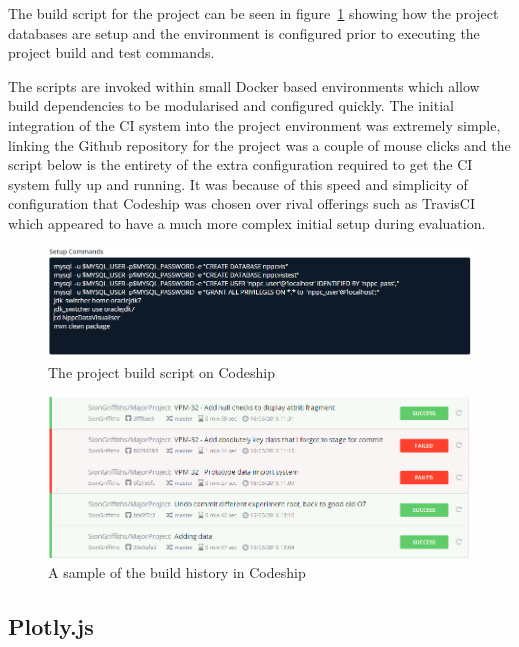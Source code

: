  The build script for the project can be seen in figure~\ref{fig:build_script} showing how the project databases are setup and the environment is configured prior to executing the project build and test commands.

 The scripts are invoked within small Docker \cite{docker} based environments which allow build dependencies to be modularised and configured quickly. The initial integration of the CI system into the project environment was extremely simple, linking the Github repository for the project was a couple of mouse clicks and the script below is the entirety of the extra configuration required to get the CI system fully up and running. It was because of this speed and simplicity of configuration that Codeship was chosen over rival offerings such as TravisCI \cite{travis} which appeared to have a much more complex initial setup during evaluation.

\begin{figure}[H]
    \centering
    \includegraphics[width=\textwidth]{images/tools/codeShipScript}
    \caption{The project build script on Codeship}
    \label{fig:build_script}
\end{figure} 

\begin{figure}[H]
    \centering
    \includegraphics[width=\textwidth]{images/tools/codeShipSmall}
    \caption{A sample of the build history in Codeship}
    \label{fig:build_history}
\end{figure} 



\subsection{Plotly.js}

